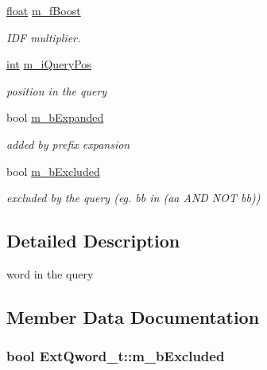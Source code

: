 \begin{DoxyCompactItemize}
\hyperlink{sphinxexpr_8cpp_a0e0d0739f7035f18f949c2db2c6759ec}{float} \hyperlink{structExtQword__t_a9d768cd56ec045a79ebb3f300de53b81}{m\-\_\-f\-Boost}
\begin{DoxyCompactList}\small\item\em I\-D\-F multiplier. \end{DoxyCompactList}\item 
\hyperlink{sphinxexpr_8cpp_a4a26e8f9cb8b736e0c4cbf4d16de985e}{int} \hyperlink{structExtQword__t_a0010f8fc64f4274a27acc5a630a2171d}{m\-\_\-i\-Query\-Pos}
\begin{DoxyCompactList}\small\item\em position in the query \end{DoxyCompactList}\item 
bool \hyperlink{structExtQword__t_abcc8f28c4b32c3d77dd12125dbf1aa85}{m\-\_\-b\-Expanded}
\begin{DoxyCompactList}\small\item\em added by prefix expansion \end{DoxyCompactList}\item 
bool \hyperlink{structExtQword__t_a465e831ef29922af7ab63460be242cc8}{m\-\_\-b\-Excluded}
\begin{DoxyCompactList}\small\item\em excluded by the query (eg. bb in (aa A\-N\-D N\-O\-T bb)) \end{DoxyCompactList}\end{DoxyCompactItemize}


\subsection{Detailed Description}
word in the query 

\subsection{Member Data Documentation}
\hypertarget{structExtQword__t_a465e831ef29922af7ab63460be242cc8}{
\subsubsection[{m\-\_\-b\-Excluded}]{\setlength{\rightskip}{0pt plus 5cm}bool Ext\-Qword\-\_\-t\-::m\-\_\-b\-Excluded}}\label{structExtQword__t_a465e831ef29922af7ab63460be242cc8}


